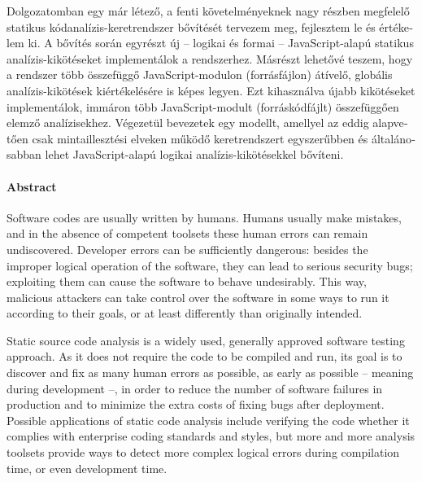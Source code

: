 \begin{otherlanguage}{magyar}
  Dolgozatomban egy már létező, a fenti követelményeknek nagy részben megfelelő statikus kódanalízis-keretrendszer bővítését tervezem meg, fejlesztem le és értékelem ki. A bővítés során egyrészt új – logikai és formai – JavaScript-alapú statikus analízis-kikötéseket implementálok a rendszerhez. Másrészt lehetővé teszem, hogy a rendszer több összefüggő JavaScript-modulon (forrásfájlon) átívelő, globális analízis-kikötések kiértékelésére is képes legyen. Ezt kihasználva újabb kikötéseket implementálok, immáron több JavaScript-modult (forráskódfájlt) összefüggően elemző analízisekhez. Végezetül bevezetek egy modellt, amellyel az eddig alapvetően csak mintaillesztési elveken működő keretrendszert egyszerűbben és általánosabban lehet JavaScript-alapú logikai analízis-kikötésekkel bővíteni.

\end{otherlanguage}

\cleardoublepage

\paragraph*{Abstract}
{}
\thispagestyle{plain}

	Software codes are usually written by humans. Humans usually make mistakes, and in the absence of competent toolsets these human errors can remain undiscovered. Developer errors can be sufficiently dangerous: besides the improper logical operation of the software, they can lead to serious security bugs; exploiting them can cause the software to behave undesirably. This way, malicious attackers can take control over the software in some ways to run it according to their goals, or at least differently than originally intended.

	Static source code analysis is a widely used, generally approved software testing approach. As it does not require the code to be compiled and run, its goal is to discover and fix as many human errors as possible, as early as possible – meaning during development –, in order to reduce the number of software failures in production and to minimize the extra costs of fixing bugs after deployment. Possible applications of static code analysis include verifying the code whether it complies with enterprise coding standards and styles, but more and more analysis toolsets provide ways to detect more complex logical errors during compilation time, or even development time.

